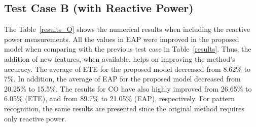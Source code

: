 
\subsection{Test Case B (with Reactive Power)}
The Table~\ref{results_Q} shows the numerical results when including the reactive power measurements. All the values in EAP were improved in the proposed model when comparing with the previous test case in Table~\ref{results}. Thus, the addition of new features, when available, helps on improving the method's accuracy. The average of ETE for the proposed model decreased from 8.62\% to 7\%. In addition, the average of EAP for the proposed model decreased from 20.25\% to 15.5\%. The results for CO have also highly improved from 26.65\% to 6.05\% (ETE), and from 89.7\% to 21.05\% (EAP), respectively. For pattern recognition, the same results are presented since the original method requires only reactive power.

